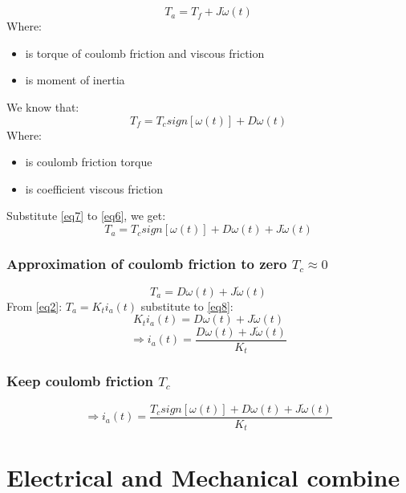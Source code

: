 \documentclass[12pt,a4paper]{article}
\begin{document}
	\begin{equation}
		T_a = T_f + J \dot{\omega}(t)
		\label{eq6}
	\end{equation}
	Where:
	\begin{itemize}
		\item { is torque of coulomb friction and viscous friction }
		\item { is moment of inertia}
	\end{itemize}
	We know that:
	\begin{equation}
		T_f = T_c sign[\omega(t)]+D\omega(t)
		\label{eq7}
	\end{equation}
	Where:
	\begin{itemize}
		\item { is coulomb friction torque}
		\item { is coefficient viscous friction}
	\end{itemize}
	Substitute \autoref{eq7} to \autoref{eq6}, we get:
	\[T_a = T_c sign[\omega(t)]+D\omega(t) + J \dot{\omega}(t)\]
	
	\subsubsection{Approximation of coulomb friction to zero \(T_c \approx 0\)}
	\begin{equation}
		T_a = D\omega(t) + J \dot{\omega}(t)
		\label{eq8}
	\end{equation}
	From \autoref{eq2}: \(T_a = K_t i_a(t)\) substitute to \autoref{eq8}:
	\[K_t i_a(t) = D\omega(t) + J \dot{\omega}(t)\]
	\begin{equation}
		\Rightarrow \boxed{i_a(t) = \frac{D\omega(t) + J \dot{\omega}(t)}{K_t}}
		\label{eq9}
	\end{equation}
	
	\subsubsection{Keep coulomb friction \(T_c\)}
	\begin{equation}
		\Rightarrow \boxed{i_a(t) = \frac{T_c sign[\omega(t)] + D\omega(t) + J \dot{\omega}(t)}{K_t}}
		\label{eq10}
	\end{equation}
	
	\section{Electrical and Mechanical combine}
\end{document}
